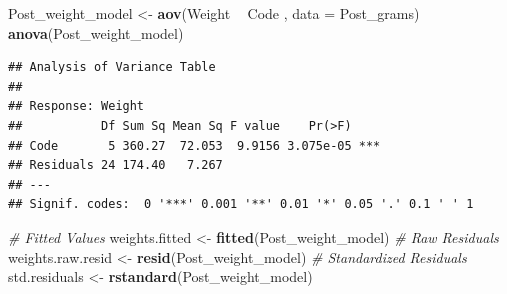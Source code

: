 \documentclass[12pt,]{article}
\newenvironment{Shaded}{\begin{snugshade}}{\end{snugshade}}
\newcommand{\KeywordTok}[1]{\textcolor[rgb]{0.13,0.29,0.53}{\textbf{#1}}}
\newcommand{\DataTypeTok}[1]{\textcolor[rgb]{0.13,0.29,0.53}{#1}}
\newcommand{\StringTok}[1]{\textcolor[rgb]{0.31,0.60,0.02}{#1}}
\newcommand{\CommentTok}[1]{\textcolor[rgb]{0.56,0.35,0.01}{\textit{#1}}}
\newcommand{\OperatorTok}[1]{\textcolor[rgb]{0.81,0.36,0.00}{\textbf{#1}}}
\newcommand{\NormalTok}[1]{#1}
\begin{document}
\begin{Shaded}
\begin{Highlighting}[]
\NormalTok{Post_weight_model <-}\StringTok{ }\KeywordTok{aov}\NormalTok{(Weight }\OperatorTok{~}\StringTok{ }\NormalTok{Code , }\DataTypeTok{data =}\NormalTok{ Post_grams)}
\KeywordTok{anova}\NormalTok{(Post_weight_model)}
\end{Highlighting}
\end{Shaded}

\begin{verbatim}
## Analysis of Variance Table
## 
## Response: Weight
##           Df Sum Sq Mean Sq F value    Pr(>F)    
## Code       5 360.27  72.053  9.9156 3.075e-05 ***
## Residuals 24 174.40   7.267                      
## ---
## Signif. codes:  0 '***' 0.001 '**' 0.01 '*' 0.05 '.' 0.1 ' ' 1
\end{verbatim}

\begin{Shaded}
\begin{Highlighting}[]
\CommentTok{# Fitted Values}
\NormalTok{weights.fitted <-}\StringTok{ }\KeywordTok{fitted}\NormalTok{(Post_weight_model)}
\CommentTok{# Raw Residuals}
\NormalTok{weights.raw.resid <-}\StringTok{ }\KeywordTok{resid}\NormalTok{(Post_weight_model) }
\CommentTok{# Standardized Residuals}
\NormalTok{std.residuals <-}\StringTok{ }\KeywordTok{rstandard}\NormalTok{(Post_weight_model)}
\end{Highlighting}
\end{Shaded}
\end{document}
